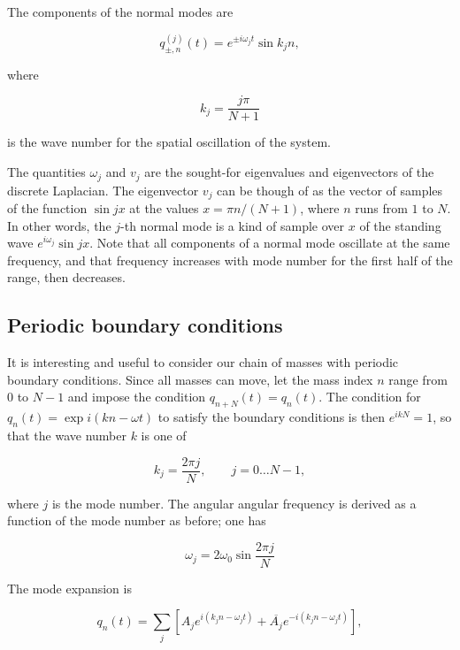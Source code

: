 The components of the normal modes are

\begin{equation}
q^{(j)}_{\pm, n}(t) =  e^{\pm i\omega_j t} \sin k_jn,
\end{equation}

where

\begin{equation}
k_j = \frac{j\pi}{N+1}
\end{equation}

is the wave number for the spatial oscillation of the system.

The quantities $\omega_j$ and $v_j$ are the sought-for eigenvalues and eigenvectors of the discrete Laplacian.  The eigenvector $v_j$ can be though of as the vector of samples of the function $\sin jx$ at the values $x = \pi n/(N+1)$, where $n$ runs from $1$ to $N$.  In other words, the $j$-th normal mode is a kind of sample over $x$ of the standing wave $e^{i\omega_j}\sin jx$.  Note that all components of a normal mode oscillate at the same frequency, and that frequency increases with mode number for the first half of the range, then decreases.



\subsection{Periodic boundary conditions}

It is interesting and useful to consider our chain of masses with periodic boundary conditions.  Since all masses can move, let the mass index $n$ range from 0 to $N-1$
and impose the condition $q_{n+N}(t) = q_n(t)$.  The condition for $q_n(t) = \exp i(kn - \omega t)$ to satisfy the boundary conditions is then $e^{ikN} = 1$, so that the wave number $k$ is one of

\begin{equation}
k_j = \frac{2\pi j}{N}, \qquad j = 0\ldots N-1,
\end{equation}

where $j$ is the mode number.
The angular angular frequency is derived as a function of the mode number as before; one has

\begin{equation}
\omega_j = 2\omega_0 \sin \frac{2\pi j}{N}
\end{equation}

The mode expansion is

\begin{equation}
q_n(t) = \sum_j [ A_j e^{i(k_jn - \omega_jt)} + \overline{A_j} e^{-i(k_jn - \omega_jt)}],
\end{equation}

